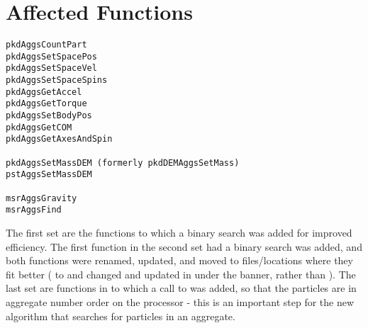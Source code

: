 \section{Affected Functions}
\begin{verbatim}
pkdAggsCountPart
pkdAggsSetSpacePos
pkdAggsSetSpaceVel
pkdAggsSetSpaceSpins
pkdAggsGetAccel
pkdAggsGetTorque
pkdAggsSetBodyPos
pkdAggsGetCOM
pkdAggsGetAxesAndSpin

pkdAggsSetMassDEM (formerly pkdDEMAggsSetMass)
pstAggsSetMassDEM

msrAggsGravity
msrAggsFind 
\end{verbatim} 

The first set are the functions to which a binary search was added for improved efficiency. 
The first function in the second set had a binary search was added, and both functions were 
renamed, updated, and moved to files/locations where they fit better (
to  and  changed and updated in  under the
 banner, rather than ). The last set are functions in  to
which a call to  was added, so that the particles are in aggregate number
order on the processor - this is an important step for the new algorithm that searches
for particles in an aggregate.




